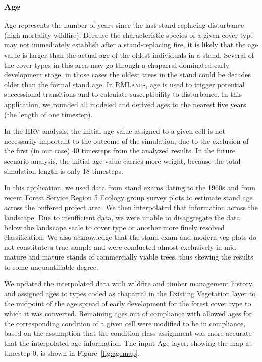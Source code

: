 


\subsubsection{Age}
Age represents the number of years since the last stand-replacing disturbance (high mortality wildfire). Because the characteristic species of a given cover type may not immediately establish after a stand-replacing fire, it is likely that the age value is larger than the actual age of the oldest individuals in a stand. Several of the cover types in this area may go through a chaparral-dominated early development stage; in those cases the oldest trees in the stand could be decades older than the formal stand age. In \textsc{RMLands}, age is used to trigger potential successional transitions and to calculate susceptibility to disturbance. In this application, we rounded all modeled and derived ages to the nearest five years (the length of one timestep).

In the HRV analysis, the initial age value assigned to a given cell is not necessarily important to the outcome of the simulation, due to the exclusion of the first (in our case) 40 timesteps from the analyzed results. In the future scenario analysis, the initial age value carries more weight, because the total simulation length is only 18 timesteps.

In this application, we used data from stand exams dating to the 1960s and from recent Forest Service Region 5 Ecology group survey plots to estimate stand age across the buffered project area. We then interpolated that information across the landscape. Due to insufficient data, we were unable to disaggregate the data below the landscape scale to cover type or another more finely resolved classification. We also acknowledge that the stand exam and modern veg plots do not constitute a true sample and were conducted almost exclusively in mid-mature and mature stands of commercially viable trees, thus skewing the results to some unquantifiable degree.

We updated the interpolated data with wildfire and timber management history, and assigned ages to types coded as chaparral in the Existing Vegetation layer to the midpoint of the age spread of early development for the forest cover type to which it was converted. Remaining ages out of compliance with allowed ages for the corresponding condition of a given cell were modified to be in compliance, based on the assumption that the condition class assignment was more accurate that the interpolated age information. The input Age layer, showing the map at timestep 0, is shown in Figure~\ref{fig:agemap}.


